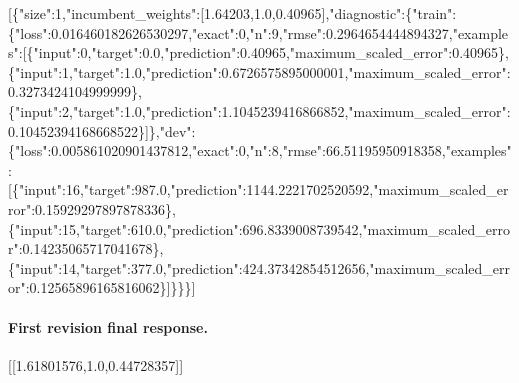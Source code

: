 [\allowbreak{}\{"size":1,\allowbreak{}"incumbent\_weights":[\allowbreak{}1.64203,\allowbreak{}1.0,\allowbreak{}0.40965]\allowbreak{},\allowbreak{}"diagnostic":\{"train":\{"loss":0.016460182626530297,\allowbreak{}"exact":0,\allowbreak{}"n":9,\allowbreak{}"rmse":0.2964654444894327,\allowbreak{}"examples":[\allowbreak{}\{"input":0,\allowbreak{}"target":0.0,\allowbreak{}"prediction":0.40965,\allowbreak{}"maximum\_scaled\_error":0.40965\},\allowbreak{}\{"input":1,\allowbreak{}"target":1.0,\allowbreak{}"prediction":0.6726575895000001,\allowbreak{}"maximum\_scaled\_error":0.3273424104999999\},\allowbreak{}\{"input":2,\allowbreak{}"target":1.0,\allowbreak{}"prediction":1.1045239416866852,\allowbreak{}"maximum\_scaled\_error":0.10452394168668522\}]\allowbreak{}\},\allowbreak{}"dev":\{"loss":0.005861020901437812,\allowbreak{}"exact":0,\allowbreak{}"n":8,\allowbreak{}"rmse":66.51195950918358,\allowbreak{}"examples":[\allowbreak{}\{"input":16,\allowbreak{}"target":987.0,\allowbreak{}"prediction":1144.2221702520592,\allowbreak{}"maximum\_scaled\_error":0.15929297897878336\},\allowbreak{}\{"input":15,\allowbreak{}"target":610.0,\allowbreak{}"prediction":696.8339008739542,\allowbreak{}"maximum\_scaled\_error":0.14235065717041678\},\allowbreak{}\{"input":14,\allowbreak{}"target":377.0,\allowbreak{}"prediction":424.37342854512656,\allowbreak{}"maximum\_scaled\_error":0.12565896165816062\}]\allowbreak{}\}\}\}]\allowbreak{}\par

\par\endgroup
\paragraph{First revision final response.}
\begingroup\footnotesize\ttfamily\raggedright\setlength{\parindent}{0pt}
[\allowbreak{}[\allowbreak{}1.61801576,\allowbreak{}1.0,\allowbreak{}0.44728357]\allowbreak{}]\allowbreak{}
\par\endgroup
